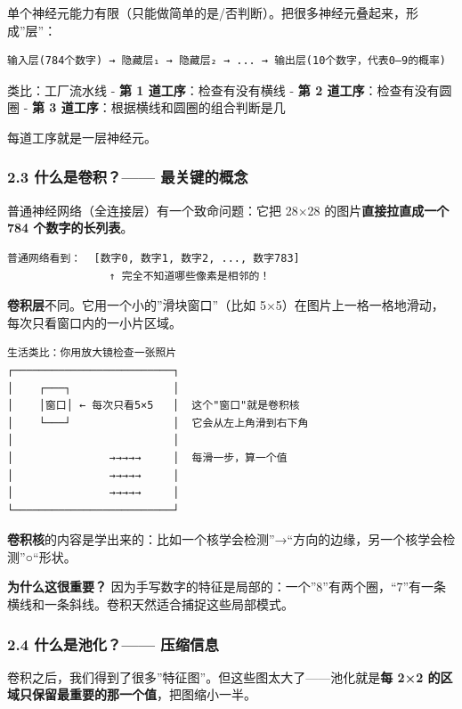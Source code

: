 \documentclass[
  11pt,
]{ctexart}
\begin{document}
单个神经元能力有限（只能做简单的是/否判断）。把很多神经元叠起来，形成”层”：

\begin{verbatim}
输入层(784个数字) → 隐藏层₁ → 隐藏层₂ → ... → 输出层(10个数字，代表0–9的概率)
\end{verbatim}

类比：工厂流水线 - \textbf{第 1 道工序}：检查有没有横线 - \textbf{第 2
道工序}：检查有没有圆圈 - \textbf{第 3
道工序}：根据横线和圆圈的组合判断是几

每道工序就是一层神经元。

\subsubsection{2.3 什么是卷积？——
最关键的概念}\label{ux4ec0ux4e48ux662fux5377ux79ef-ux6700ux5173ux952eux7684ux6982ux5ff5}

普通神经网络（全连接层）有一个致命问题：它把 28×28
的图片\textbf{直接拉直成一个 784 个数字的长列表}。

\begin{verbatim}
普通网络看到：  [数字0, 数字1, 数字2, ..., 数字783]
                ↑ 完全不知道哪些像素是相邻的！
\end{verbatim}

\textbf{卷积层}不同。它用一个小的”滑块窗口”（比如
5×5）在图片上一格一格地滑动，每次只看窗口内的一小片区域。

\begin{verbatim}
生活类比：你用放大镜检查一张照片
┌─────────────────────────┐
│    ┌───┐                │
│    │窗口│ ← 每次只看5×5   │  这个"窗口"就是卷积核
│    └───┘                │  它会从左上角滑到右下角
│                         │
│               →→→→→     │  每滑一步，算一个值
│               →→→→→     │
│               →→→→→     │
└─────────────────────────┘
\end{verbatim}

\textbf{卷积核}的内容是学出来的：比如一个核学会检测”→“方向的边缘，另一个核学会检测”○“形状。

\textbf{为什么这很重要？}
因为手写数字的特征是局部的：一个”8”有两个圈，“7”有一条横线和一条斜线。卷积天然适合捕捉这些局部模式。

\subsubsection{2.4 什么是池化？——
压缩信息}\label{ux4ec0ux4e48ux662fux6c60ux5316-ux538bux7f29ux4fe1ux606f}

卷积之后，我们得到了很多”特征图”。但这些图太大了——池化就是\textbf{每 2×2
的区域只保留最重要的那一个值}，把图缩小一半。
\end{document}
